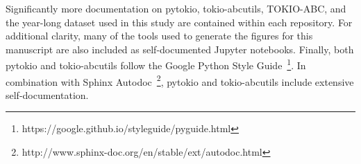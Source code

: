 Significantly more documentation on pytokio, tokio-abcutils, TOKIO-ABC, and the year-long dataset used in this study are contained within each repository.
For additional clarity, many of the tools used to generate the figures for this manuscript are also included as self-documented Jupyter notebooks.
Finally, both pytokio and tokio-abcutils follow the Google Python Style Guide~\footnote{https://google.github.io/styleguide/pyguide.html}.
In combination with Sphinx Autodoc~\footnote{http://www.sphinx-doc.org/en/stable/ext/autodoc.html}, pytokio and tokio-abcutils include extensive self-documentation.